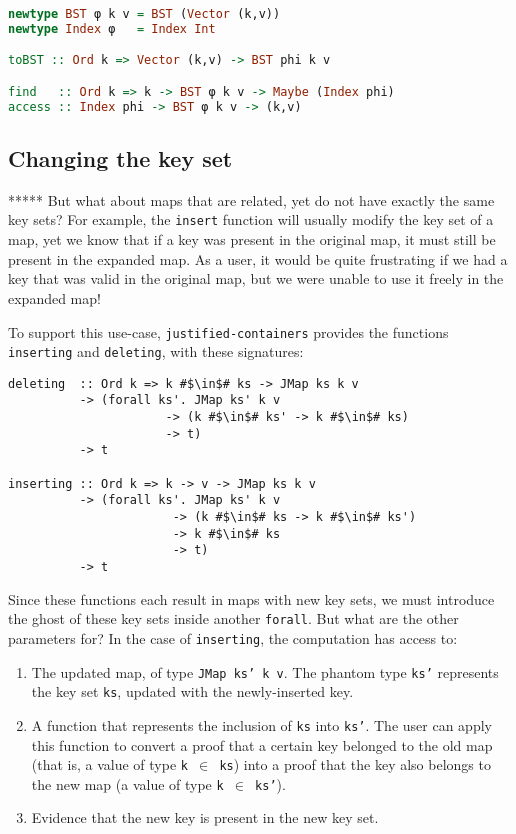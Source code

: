 \documentclass[format=sigplan, review=false, screen=true]{acmart}
\begin{document}
\begin{lstlisting}[language=Haskell]
newtype BST φ k v = BST (Vector (k,v))
newtype Index φ   = Index Int

toBST :: Ord k => Vector (k,v) -> BST phi k v

find   :: Ord k => k -> BST φ k v -> Maybe (Index phi)
access :: Index phi -> BST φ k v -> (k,v)
\end{lstlisting}

\subsection{Changing the key set}
*****
But what about maps that are related, yet do not have exactly the same key sets?
For example, the \texttt{insert} function will usually modify the key set of a map,
yet we know that if a key was present in the original map, it must still be present
in the expanded map. As a user, it would be quite frustrating if we had a key that
was valid in the original map, but we were unable to use it freely in the expanded map!

To support this use-case, \texttt{justified-containers} provides the functions
\texttt{inserting} and \texttt{deleting}, with these signatures:
\begin{verbatim}
deleting  :: Ord k => k #$\in$# ks -> JMap ks k v
          -> (forall ks'. JMap ks' k v
                      -> (k #$\in$# ks' -> k #$\in$# ks)
                      -> t)
          -> t

inserting :: Ord k => k -> v -> JMap ks k v
          -> (forall ks'. JMap ks' k v
                       -> (k #$\in$# ks -> k #$\in$# ks')
                       -> k #$\in$# ks
                       -> t)
          -> t
\end{verbatim}
Since these functions each result in maps with new key sets, we must
introduce the ghost of these key sets inside another \texttt{forall}.
But what are the other parameters for? In the case of \texttt{inserting},
the computation has access to:
\begin{enumerate}
\item The updated map, of type \texttt{JMap ks' k v}. The phantom type \texttt{ks'}
  represents the key set \texttt{ks}, updated with the newly-inserted key.
\item A function that represents the inclusion of \texttt{ks} into \texttt{ks'}.
  The user can apply this function to convert a proof that a certain key belonged to the
  old map (that is, a value of type \texttt{k $\in$ ks}) into a proof that the key also belongs to the new map (a value of type \texttt{k $\in$ ks'}).
\item Evidence that the new key is present in the new key set.
\end{enumerate}
\end{document}
